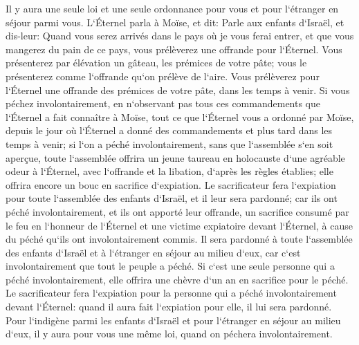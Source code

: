 \verse Il y aura une seule loi et une seule ordonnance pour vous et pour l`étranger en séjour parmi vous. 
\verse L`Éternel parla à Moïse, et dit: 
\verse Parle aux enfants d`Israël, et dis-leur: Quand vous serez arrivés dans le pays où je vous ferai entrer, 
\verse et que vous mangerez du pain de ce pays, vous prélèverez une offrande pour l`Éternel. 
\verse Vous présenterez par élévation un gâteau, les prémices de votre pâte; vous le présenterez comme l`offrande qu`on prélève de l`aire. 
\verse Vous prélèverez pour l`Éternel une offrande des prémices de votre pâte, dans les temps à venir. 
\verse Si vous péchez involontairement, en n`observant pas tous ces commandements que l`Éternel a fait connaître à Moïse, 
\verse tout ce que l`Éternel vous a ordonné par Moïse, depuis le jour où l`Éternel a donné des commandements et plus tard dans les temps à venir; 
\verse si l`on a péché involontairement, sans que l`assemblée s`en soit aperçue, toute l`assemblée offrira un jeune taureau en holocauste d`une agréable odeur à l`Éternel, avec l`offrande et la libation, d`après les règles établies; elle offrira encore un bouc en sacrifice d`expiation. 
\verse Le sacrificateur fera l`expiation pour toute l`assemblée des enfants d`Israël, et il leur sera pardonné; car ils ont péché involontairement, et ils ont apporté leur offrande, un sacrifice consumé par le feu en l`honneur de l`Éternel et une victime expiatoire devant l`Éternel, à cause du péché qu`ils ont involontairement commis. 
\verse Il sera pardonné à toute l`assemblée des enfants d`Israël et à l`étranger en séjour au milieu d`eux, car c`est involontairement que tout le peuple a péché. 
\verse Si c`est une seule personne qui a péché involontairement, elle offrira une chèvre d`un an en sacrifice pour le péché. 
\verse Le sacrificateur fera l`expiation pour la personne qui a péché involontairement devant l`Éternel: quand il aura fait l`expiation pour elle, il lui sera pardonné. 
\verse Pour l`indigène parmi les enfants d`Israël et pour l`étranger en séjour au milieu d`eux, il y aura pour vous une même loi, quand on péchera involontairement. 
